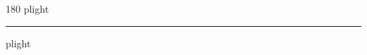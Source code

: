 
\begin{frame}
\begin{center}
\begin{turn}{180}
{\fontsize{2.5cm}{1em}\selectfont plight}
\end{turn}
\vspace{1em}\par  
\hrule
\vspace{1em}\par  
{\fontsize{2.5cm}{1em}\selectfont plight}
\end{center}
\end{frame}
